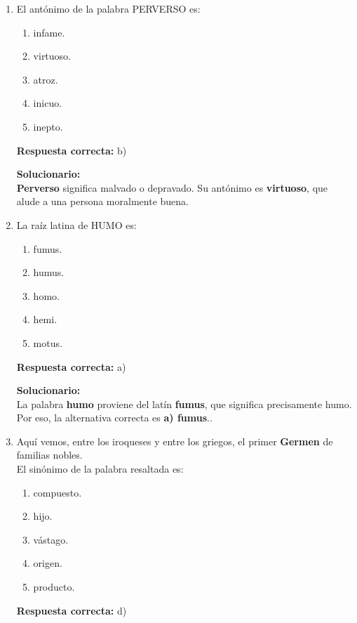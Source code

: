 \begin{enumerate}
	
	\item El antónimo de la palabra PERVERSO es:
	\begin{enumerate}[label=\alph*)]
		\item infame.
		\item virtuoso.
		\item atroz.
		\item inicuo.
		\item inepto.
	\end{enumerate}
	\textbf{Respuesta correcta:} b)
	
	\vspace{2mm}
	\textbf{Solucionario:}\\
	\textbf{Perverso} significa malvado o depravado. Su antónimo es \textbf{virtuoso}, que alude a una persona moralmente buena.
	
	\vspace{6mm}
	
	\item La raíz latina de HUMO es:
	\begin{enumerate}[label=\alph*)]
		\item fumus.
		\item humus.
		\item homo.
		\item hemi.
		\item motus.
	\end{enumerate}
	\textbf{Respuesta correcta:} a)
	
	\vspace{2mm}
	\textbf{Solucionario:}\\
	La palabra \textbf{humo} proviene del latín \textbf{fumus}, que significa precisamente humo.\\
	Por eso, la alternativa correcta es \textbf{a) fumus}..
	
	\vspace{6mm}
	
	\item Aquí vemos, entre los iroqueses y entre los griegos, el primer \textbf{Germen} de familias nobles.\\
	El sinónimo de la palabra resaltada es:
	\begin{enumerate}[label=\alph*)]
		\item compuesto.
		\item hijo.
		\item vástago.
		\item origen.
		\item producto.
	\end{enumerate}
	\textbf{Respuesta correcta:} d)
	

\end{enumerate}
